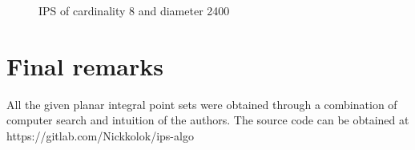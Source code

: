 \documentclass[12pt]{article}
\theoremstyle{theorem}
\theoremstyle{dfn}
\theoremstyle{remark}
\begin{document}
\begin{figure}[h!]
	\parbox{1\linewidth}{\caption{IPS of cardinality 8 and diameter 2400}
	\label{8_2400_42_56f3}}
\end{figure}



\section{Final remarks}
All the given planar integral point sets were obtained through a combination of computer search and intuition of the authors.
The source code can be obtained at https://gitlab.com/Nickkolok/ips-algo

\printbibliography
\end{document}
